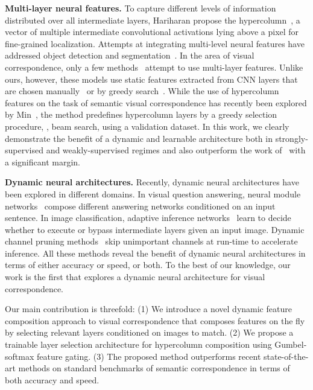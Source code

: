 \documentclass[runningheads]{llncs}
\begin{document}
\smallbreak
\noindent \textbf{Multi-layer neural features.}
To capture different levels of information distributed over all intermediate layers, Hariharan \etal propose the hypercolumn~\cite{hariharan2015hypercolumns}, a vector of multiple intermediate convolutional activations lying above a pixel for fine-grained localization. Attempts at integrating multi-level neural features have addressed object detection and segmentation~\cite{kong2016hypernet,lin2017feature,liu2018receptive}. In the area of visual correspondence, only a few methods~\cite{min2019hyperpixel,novotny2017anchornet,ufer2017deep} attempt to use multi-layer features. Unlike ours, however, these models use static features extracted from CNN layers that are chosen manually~\cite{novotny2017anchornet,ufer2017deep} or by greedy search~\cite{min2019hyperpixel}. While the use of hypercolumn features on the task of semantic visual correspondence has recently been explored by Min~\etal\cite{min2019hyperpixel}, the method predefines hypercolumn layers by a greedy selection procedure, \ie, beam search, using a validation dataset. 
In this work, we clearly demonstrate the benefit of a dynamic and learnable architecture both in strongly-supervised and weakly-supervised regimes and also outperform the work of~\cite{min2019hyperpixel} with a significant margin.  

\smallbreak
\noindent \textbf{Dynamic neural architectures.}
Recently, dynamic neural architectures have been explored in different domains.
In visual question answering, neural module networks~\cite{andreas2016learning,andreas2016neural} compose different answering networks conditioned on an input sentence. 
In image classification, adaptive inference networks~\cite{figurnov2017spatially,srivastava2015highway,veit2018convolutional} learn to decide whether to execute or bypass intermediate layers given an input image.
Dynamic channel pruning methods~\cite{gao2018dynamic,hua2018channel} skip unimportant channels at run-time to accelerate inference. All these methods reveal the benefit of dynamic neural architectures in terms of either accuracy or speed, or both. 
To the best of our knowledge, our work is the first that explores a dynamic neural architecture for visual correspondence.

Our main contribution is threefold: (1) We introduce a novel dynamic feature composition approach to visual correspondence that composes features on the fly by selecting relevant layers conditioned on images to match. (2) We propose a trainable layer selection architecture for hypercolumn composition using Gumbel-softmax feature gating. (3) The proposed method outperforms recent state-of-the-art methods on standard benchmarks of semantic correspondence in terms of both accuracy and speed.  
\end{document}
